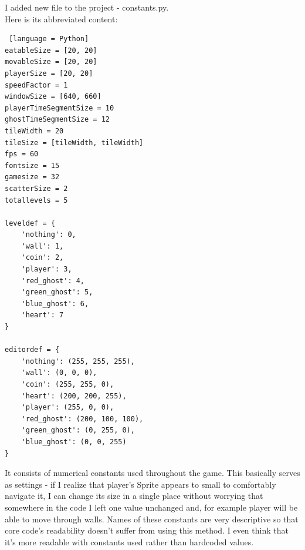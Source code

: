 \documentclass[11pt,a4paper,notitlepage]{report}
\begin{document}
				I added new file to the project - constants.py.\\
				Here is its abbreviated content:
				\begin{lstlisting} [language = Python]
eatableSize = [20, 20]
movableSize = [20, 20]
playerSize = [20, 20]
speedFactor = 1
windowSize = [640, 660]
playerTimeSegmentSize = 10
ghostTimeSegmentSize = 12
tileWidth = 20
tileSize = [tileWidth, tileWidth]
fps = 60
fontsize = 15
gamesize = 32
scatterSize = 2
totallevels = 5

leveldef = {
	'nothing': 0,
	'wall': 1,
	'coin': 2,
	'player': 3,
	'red_ghost': 4,
	'green_ghost': 5,
	'blue_ghost': 6,
	'heart': 7
}

editordef = {
	'nothing': (255, 255, 255),
	'wall': (0, 0, 0),
	'coin': (255, 255, 0),
	'heart': (200, 200, 255),
	'player': (255, 0, 0),
	'red_ghost': (200, 100, 100),
	'green_ghost': (0, 255, 0),
	'blue_ghost': (0, 0, 255)
}
				\end{lstlisting}
				It consists of numerical constants used throughout the game. This basically serves as settings - if I realize that player's Sprite appears to small to comfortably navigate it, I can change its size in a single place without worrying that somewhere in the code I left one value unchanged and, for example player will be able to move through walls. Names of these constants are very descriptive so that core code's readability doesn't suffer from using this method. I even think that it's more readable with constants used rather than hardcoded values.
\end{document}
